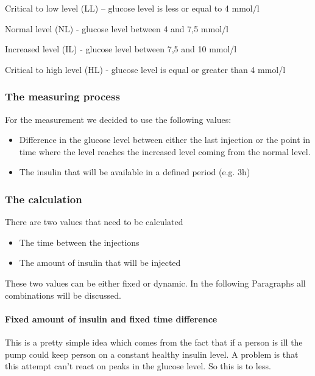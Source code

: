 \documentclass[pdflatex,a4paper,11pt,english]{scrreprt}
\begin{document}
Critical to low level (LL) – glucose level is less or equal to 4 mmol/l

Normal  level (NL) - glucose level between 4 and 7,5 mmol/l

Increased level (IL) - glucose level between 7,5 and 10 mmol/l

Critical to high level (HL) - glucose level is equal or greater than 4 mmol/l

\subsubsection{The measuring process}
For the measurement we decided to use the following values:
\begin{itemize}
  \item Difference in the glucose level between either the last injection or
  the point in time where the level reaches the increased level coming from the normal level.
  \item The insulin that will be available in a defined period (e.g. 3h) 
\end{itemize}

\subsubsection{The calculation}
There are two values that need to be calculated
\begin{itemize}
  \item The time between the injections
  \item The amount of insulin that will be injected  
\end{itemize}
These two values can be either fixed or dynamic. In the following Paragraphs all combinations will be discussed.

\paragraph{Fixed amount of insulin and fixed time difference}
This is a pretty simple idea which comes from the fact that if a person is ill the pump could keep person on a constant healthy insulin level. A problem is that this attempt can’t react on peaks in the glucose level. So this is to less.
\end{document}
